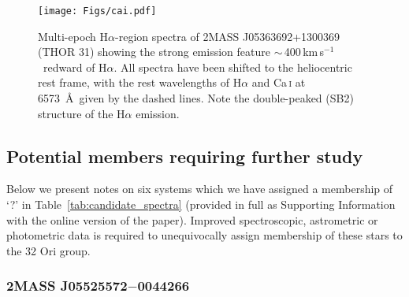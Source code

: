\documentclass[usenatbib]{mnras}
\newcommand{\kms}{\textrm{km\,s$^{-1}$}}
\begin{document}
\begin{figure}
\centering
\texttt{[image: Figs/cai.pdf]}
\caption[]{Multi-epoch H$\alpha$-region spectra of 2MASS
  J05363692+1300369 (THOR 31) showing the strong emission feature $\sim$\,400\,\kms\ redward of H$\alpha$. All spectra have been
  shifted to the heliocentric rest frame, with the rest wavelengths of
  H$\alpha$ and Ca\,\textsc{i} at 6573~\AA\ given by the dashed lines. Note the
  double-peaked (SB2) structure of the H$\alpha$ emission.}
\label{fig:cai}
\end{figure}

\subsection{Potential members requiring further study}
\label{notes_possible_members}

Below we present notes on six systems which we have assigned a
membership of `?' in Table~\ref{tab:candidate_spectra} (provided
in full as Supporting Information with the online version of the paper). Improved spectroscopic, astrometric or photometric data is required to
unequivocally assign membership of these stars to the 32 Ori group.

\subsubsection{2MASS J05525572$-$0044266}
\label{2massj0552-0044}
\end{document}
